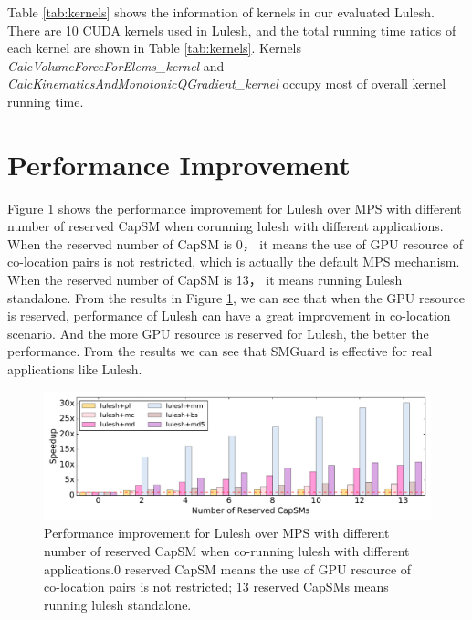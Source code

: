 \documentclass[a4paper,9pt]{article}
\begin{document}
Table \ref{tab:kernels} shows the information of kernels in our evaluated Lulesh. There are 10 CUDA kernels used in Lulesh, and the total running time ratios of each kernel are shown in Table \ref{tab:kernels}. Kernels \emph{CalcVolumeForceForElems\_kernel} and \emph{CalcKinematicsAndMonotonicQGradient\_kernel} occupy most of overall kernel running time.

\section{Performance Improvement}

Figure \ref{fig:performance_improvement} shows the performance improvement for Lulesh over MPS with different number of reserved CapSM when corunning lulesh with different applications. When the reserved number of CapSM is 0， it means the use of GPU resource of co-location pairs is not restricted, which is actually the default MPS mechanism. When the reserved number of CapSM is 13， it means running Lulesh standalone. From the results in Figure \ref{fig:performance_improvement}, we can see that when the GPU resource is reserved, performance of Lulesh can have a great improvement in co-location scenario. And the more GPU resource is reserved for Lulesh, the better the performance. From the results we can see that SMGuard is effective for real applications like Lulesh. 

\begin{figure}[!t]
	\centering
	\includegraphics[width=6.5in]{fig/lulesh_performance_over_mps.pdf}
	\caption{Performance improvement for Lulesh over MPS with different number of reserved CapSM when co-running lulesh with different applications.0 reserved CapSM means the use of GPU resource of co-location pairs is not restricted; 13 reserved CapSMs means running lulesh standalone.}
	\label{fig:performance_improvement}
\end{figure}
\end{document}
